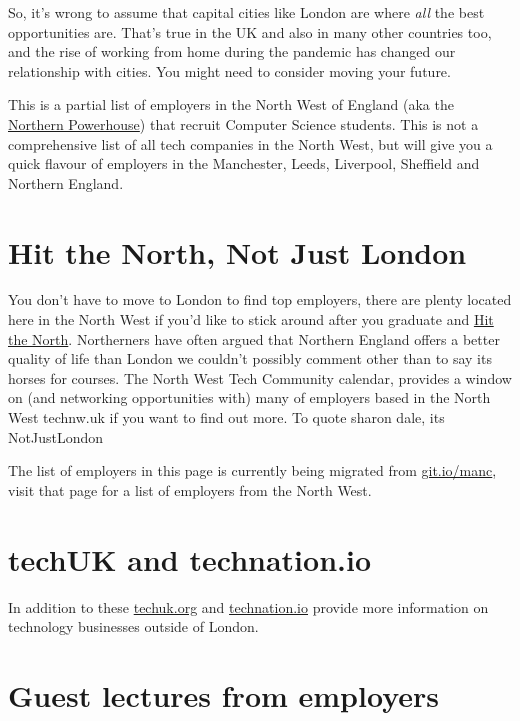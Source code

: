 \documentclass[
]{book}
\begin{document}
So, it's wrong to assume that capital cities like London are where \emph{all} the best opportunities are. That's true in the UK and also in many other countries too, and the rise of working from home during the pandemic has changed our relationship with cities. You might need to consider moving your future.

This is a partial list of employers in the North West of England (aka the \href{https://en.wikipedia.org/wiki/Northern_Powerhouse}{Northern Powerhouse}) that recruit Computer Science students. This is not a comprehensive list of all tech companies in the North West, but will give you a quick flavour of employers in the Manchester, Leeds, Liverpool, Sheffield and Northern England.

\hypertarget{hit-the-north-not-just-london}{%
\section{Hit the North, Not Just London}\label{hit-the-north-not-just-london}}

You don't have to move to London to find top employers, there are plenty located here in the North West if you'd like to stick around after you graduate and \href{https://en.wikipedia.org/wiki/Hit_the_North}{Hit the North}. \citep{hitthenorth} Northerners have often argued that Northern England offers a better quality of life than London we couldn't possibly comment other than to say its horses for courses. The North West Tech Community calendar, provides a window on (and networking opportunities with) many of employers based in the North West technw.uk if you want to find out more. To quote sharon dale, its NotJustLondon \citep{notjustlondon}

The list of employers in this page is currently being migrated from \href{https://git.io/manc}{git.io/manc}, visit that page for a list of employers from the North West.

\hypertarget{techuk-and-technation.io}{%
\section{techUK and technation.io}\label{techuk-and-technation.io}}

In addition to these \href{https://www.techuk.org}{techuk.org} and \href{https://technation.io}{technation.io} provide more information on technology businesses outside of London.

\hypertarget{guestlectures}{%
\section{Guest lectures from employers}\label{guestlectures}}
\end{document}
